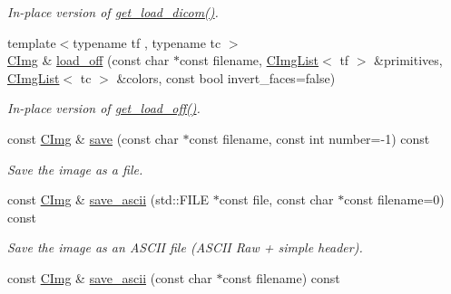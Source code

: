 \begin{DoxyCompactItemize}
\begin{DoxyCompactList}\small\item\em In-\/place version of \hyperlink{structcimg__library_1_1_c_img_a9a48fd037190ca8426c1078f4c18cedb}{get\_\-load\_\-dicom()}. \item\end{DoxyCompactList}\item 
\hypertarget{structcimg__library_1_1_c_img_a0a20090d6e9a02168c7738e523c4a4c5}{
{\footnotesize template$<$typename tf , typename tc $>$ }\\\hyperlink{structcimg__library_1_1_c_img}{CImg} \& \hyperlink{structcimg__library_1_1_c_img_a0a20090d6e9a02168c7738e523c4a4c5}{load\_\-off} (const char $\ast$const filename, \hyperlink{structcimg__library_1_1_c_img_list}{CImgList}$<$ tf $>$ \&primitives, \hyperlink{structcimg__library_1_1_c_img_list}{CImgList}$<$ tc $>$ \&colors, const bool invert\_\-faces=false)}
\label{structcimg__library_1_1_c_img_a0a20090d6e9a02168c7738e523c4a4c5}

\begin{DoxyCompactList}\small\item\em In-\/place version of \hyperlink{structcimg__library_1_1_c_img_aed9b8af2ab569c6b1cfbd41b15553900}{get\_\-load\_\-off()}. \item\end{DoxyCompactList}\item 
const \hyperlink{structcimg__library_1_1_c_img}{CImg} \& \hyperlink{structcimg__library_1_1_c_img_a593d3d4f5eae665e93c3f551b2da3f03}{save} (const char $\ast$const filename, const int number=-\/1) const 
\begin{DoxyCompactList}\small\item\em Save the image as a file. \item\end{DoxyCompactList}\item 
\hypertarget{structcimg__library_1_1_c_img_a0347f20f842430c63ddc0ff39fd62ddf}{
const \hyperlink{structcimg__library_1_1_c_img}{CImg} \& \hyperlink{structcimg__library_1_1_c_img_a0347f20f842430c63ddc0ff39fd62ddf}{save\_\-ascii} (std::FILE $\ast$const file, const char $\ast$const filename=0) const }
\label{structcimg__library_1_1_c_img_a0347f20f842430c63ddc0ff39fd62ddf}

\begin{DoxyCompactList}\small\item\em Save the image as an ASCII file (ASCII Raw + simple header). \item\end{DoxyCompactList}\item 
\hypertarget{structcimg__library_1_1_c_img_a5c4b4bfa11a6c0fe71460d750db05a27}{
const \hyperlink{structcimg__library_1_1_c_img}{CImg} \& \hyperlink{structcimg__library_1_1_c_img_a5c4b4bfa11a6c0fe71460d750db05a27}{save\_\-ascii} (const char $\ast$const filename) const }
\label{structcimg__library_1_1_c_img_a5c4b4bfa11a6c0fe71460d750db05a27}


\end{DoxyCompactItemize}
